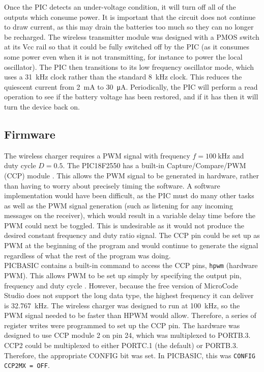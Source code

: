 Once the PIC detects an under-voltage condition, it will turn off all of the outputs which consume power. It is important that the circuit does not continue to draw current, as this may drain the batteries too much so they can no longer be recharged. The wireless transmitter module was designed with a PMOS switch at its Vcc rail so that it could be fully switched off by the PIC (as it consumes some power even when it is not transmitting, for instance to power the local oscillator). The PIC then transitions to its low frequency oscillator mode, which uses a \SI{31}{\kilo\hertz} clock rather than the standard \SI{8}{\kilo\hertz} clock. This reduces the quiescent current from \SI{2}{\milli\ampere} to \SI{30}{\micro\ampere}. Periodically, the PIC will perform a read operation to see if the battery voltage has been restored, and if it has then it will turn the device back on.\\






\subsection{Firmware}
The wireless charger requires a PWM signal with frequency $f=\SI{100}{\kilo\hertz}$ and duty cycle $D=0.5$. The PIC18F2550 has a built-in Capture/Compare/PWM (CCP) module \cite{pic18f2550}. This allows the PWM signal to be generated in hardware, rather than having to worry about precisely timing the software. A software implementation would have been difficult, as the PIC must do many other tasks as well as the PWM signal generation (such as listening for any incoming messages on the receiver), which would result in a variable delay time before the PWM could next be toggled. This is undesirable as it would not produce the desired constant frequency and duty ratio signal. The CCP pin could be set up as PWM at the beginning of the program and would continue to generate the signal regardless of what the rest of the program was doing.\\

PICBASIC contains a built-in command to access the CCP pins, \verb|hpwm| (hardware PWM). This allows PWM to be set up simply by specifying the output pin, frequency and duty cycle \cite{picbasic_pro}. However, because the free version of MicroCode Studio does not support the long data type, the highest frequency it can deliver is \SI{32.767}{\kilo\hertz}. The wireless charger was designed to run at \SI{100}{\kilo\hertz}, so the PWM signal needed to be faster than HPWM would allow. Therefore, a series of register writes were programmed to set up the CCP pin. The hardware was designed to use CCP module 2 on pin 24, which was multiplexed to PORTB.3. CCP2 could be multiplexed to either PORTC.1 (the default) or PORTB.3. Therefore, the appropriate CONFIG bit was set. In PICBASIC, this was \verb|CONFIG CCP2MX = OFF|.\\

